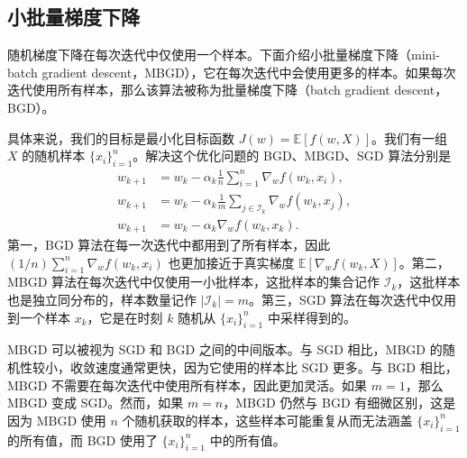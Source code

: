 \subsection{小批量梯度下降}
\label{sec:rl-sa-mbgd}

随机梯度下降在每次迭代中仅使用一个样本。下面介绍小批量梯度下降（mini-batch gradient descent，MBGD），它在每次迭代中会使用更多的样本。如果每次迭代使用所有样本，那么该算法被称为批量梯度下降（batch gradient descent，BGD）。

具体来说，我们的目标是最小化目标函数 $J(w) = \mathbb{E}[f(w, X)]$。我们有一组 $X$ 的随机样本 $\{x_i\}_{i=1}^n$。解决这个优化问题的 BGD、MBGD、SGD 算法分别是
\begin{align}
w_{k+1} &= w_k - \alpha_k \frac{1}{n} \sum_{i=1}^{n} \nabla_w f(w_k, x_i), \tag{BGD} \\
w_{k+1} &= w_k - \alpha_k \frac{1}{m} \sum_{j \in \mathcal{I}_k} \nabla_w f(w_k, x_j), \tag{MBGD} \\
w_{k+1} &= w_k - \alpha_k \nabla_w f(w_k, x_k). \tag{SGD}
\end{align}
第一，BGD 算法在每一次迭代中都用到了所有样本，因此 $(1/n) \sum_{i=1}^{n} \nabla_w f(w_k, x_i)$ 也更加接近于真实梯度 $\mathbb{E}[\nabla_w f(w_k, X)]$。第二，MBGD 算法在每次迭代中仅使用一小批样本，这批样本的集合记作 $\mathcal{I}_k$，这批样本也是独立同分布的，样本数量记作 $|\mathcal{I}_k| = m$。第三，SGD 算法在每次迭代中仅用到一个样本 $x_k$，它是在时刻 $k$ 随机从 $\{x_i\}_{i=1}^n$ 中采样得到的。

MBGD 可以被视为 SGD 和 BGD 之间的中间版本。与 SGD 相比，MBGD 的随机性较小，收敛速度通常更快，因为它使用的样本比 SGD 更多。与 BGD 相比，MBGD 不需要在每次迭代中使用所有样本，因此更加灵活。如果 $m = 1$，那么 MBGD 变成 SGD。然而，如果 $m = n$，MBGD 仍然与 BGD 有细微区别，这是因为 MBGD 使用 $n$ 个随机获取的样本，这些样本可能重复从而无法涵盖 $\{x_i\}_{i=1}^n$ 的所有值，而 BGD 使用了 $\{x_i\}_{i=1}^n$ 中的所有值。

